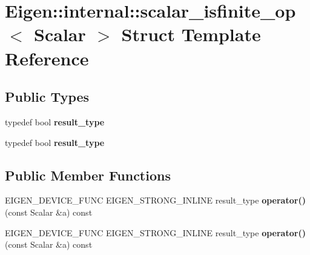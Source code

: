 \hypertarget{struct_eigen_1_1internal_1_1scalar__isfinite__op}{}\section{Eigen\+:\+:internal\+:\+:scalar\+\_\+isfinite\+\_\+op$<$ Scalar $>$ Struct Template Reference}
\label{struct_eigen_1_1internal_1_1scalar__isfinite__op}
\subsection*{Public Types}
\begin{DoxyCompactItemize}
\item 
\mbox{\label{struct_eigen_1_1internal_1_1scalar__isfinite__op_a2e842dad628a7c9b2d554f8f1d4a9b55}} 
typedef bool {\bfseries result\+\_\+type}
\item 
\mbox{\label{struct_eigen_1_1internal_1_1scalar__isfinite__op_a2e842dad628a7c9b2d554f8f1d4a9b55}} 
typedef bool {\bfseries result\+\_\+type}
\end{DoxyCompactItemize}
\subsection*{Public Member Functions}
\begin{DoxyCompactItemize}
\item 
\mbox{\label{struct_eigen_1_1internal_1_1scalar__isfinite__op_aa7b8bc7748af4a93d1096c079b9c61b7}} 
E\+I\+G\+E\+N\+\_\+\+D\+E\+V\+I\+C\+E\+\_\+\+F\+U\+NC E\+I\+G\+E\+N\+\_\+\+S\+T\+R\+O\+N\+G\+\_\+\+I\+N\+L\+I\+NE result\+\_\+type {\bfseries operator()} (const Scalar \&a) const
\item 
\mbox{\label{struct_eigen_1_1internal_1_1scalar__isfinite__op_aa7b8bc7748af4a93d1096c079b9c61b7}} 
E\+I\+G\+E\+N\+\_\+\+D\+E\+V\+I\+C\+E\+\_\+\+F\+U\+NC E\+I\+G\+E\+N\+\_\+\+S\+T\+R\+O\+N\+G\+\_\+\+I\+N\+L\+I\+NE result\+\_\+type {\bfseries operator()} (const Scalar \&a) const
\end{DoxyCompactItemize}


